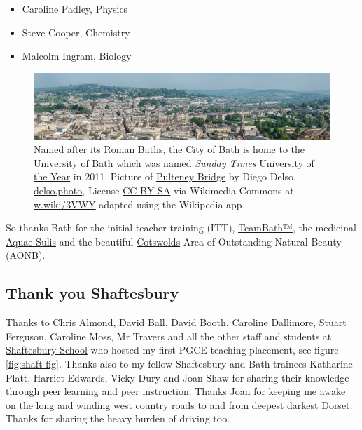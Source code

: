 \documentclass[
]{book}
\providecommand{\tightlist}{%
  \setlength{\itemsep}{0pt}\setlength{\parskip}{0pt}}
\begin{document}
\begin{itemize}
\tightlist
\item
  Caroline Padley, Physics
\item
  Steve Cooper, Chemistry
\item
  Malcolm Ingram, Biology
\end{itemize}

\begin{figure}

{\centering \includegraphics[width=1\linewidth]{images/bath-panorama} 

}

\caption{Named after its \href{https://en.wikipedia.org/wiki/Roman_Baths_(Bath)}{Roman Baths}, the \href{https://en.wikipedia.org/wiki/Bath,_Somerset}{City of Bath} is home to the University of Bath which was named \href{https://en.wikipedia.org/wiki/Sunday_Times_University_of_the_Year}{\emph{Sunday Times} University of the Year} in 2011. Picture of \href{https://en.wikipedia.org/wiki/Pulteney_Bridge}{Pulteney Bridge} by Diego Delso, \href{http://delso.photo/}{delso.photo}, License \href{https://creativecommons.org/licenses/by-sa/4.0/legalcode}{CC-BY-SA} via Wikimedia Commons at \href{https://w.wiki/3VWY}{w.wiki/3VWY} adapted using the Wikipedia app}\label{fig:bath-fig}
\end{figure}



So thanks Bath for the initial teacher training (ITT), \href{https://www.teambath.com/}{TeamBath™}, the medicinal \href{https://en.wikipedia.org/wiki/Aquae_Sulis}{Aquae Sulis} and the beautiful \href{https://en.wikipedia.org/wiki/Cotswolds}{Cotswolds} Area of Outstanding Natural Beauty (\href{https://en.wikipedia.org/wiki/Area_of_Outstanding_Natural_Beauty}{AONB}). 🙏

\hypertarget{shaftesbury}{%
\subsection{Thank you Shaftesbury}\label{shaftesbury}}

Thanks to Chris Almond, David Ball, David Booth, Caroline Dallimore, Stuart Ferguson, Caroline Moss, Mr Travers and all the other staff and students at \href{https://en.wikipedia.org/wiki/Shaftesbury_School}{Shaftesbury School} who hosted my first PGCE teaching placement, see figure \ref{fig:shaft-fig}. Thanks also to my fellow Shaftesbury and Bath trainees Katharine Platt, Harriet Edwards, Vicky Dury and Joan Shaw for sharing their knowledge through \href{https://en.wikipedia.org/wiki/Peer_learning}{peer learning} and \href{https://en.wikipedia.org/wiki/Peer_instruction}{peer instruction}. Thanks Joan for keeping me awake on the long and winding west country roads to and from deepest darkest Dorset. Thanks for sharing the heavy burden of driving too.
\end{document}
